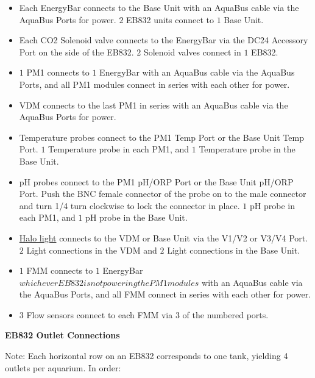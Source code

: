 \documentclass[]{book}
\providecommand{\tightlist}{%
  \setlength{\itemsep}{0pt}\setlength{\parskip}{0pt}}
\begin{document}
\begin{itemize}
\tightlist
\item
  Each EnergyBar connects to the Base Unit with an AquaBus cable via the
  AquaBus Ports for power. \(2\) EB832 units connect to \(1\) Base
  Unit.\\
\item
  Each CO2 Solenoid valve connects to the EnergyBar via the DC24
  Accessory Port on the side of the EB832. \(2\) Solenoid valves connect
  in \(1\) EB832.\\
\item
  \(1\) PM1 connects to \(1\) EnergyBar with an AquaBus cable via the
  AquaBus Ports, and all PM1 modules connect in series with each other
  for power.\\
\item
  VDM connects to the last PM1 in series with an AquaBus cable via the
  AquaBus Ports for power.\\
\item
  Temperature probes connect to the PM1 Temp Port or the Base Unit Temp
  Port. \(1\) Temperature probe in each PM1, and \(1\) Temperature probe
  in the Base Unit.\\
\item
  pH probes connect to the PM1 pH/ORP Port or the Base Unit pH/ORP Port.
  Push the BNC female connector of the probe on to the male connector
  and turn 1/4 turn clockwise to lock the connector in place. \(1\) pH
  probe in each PM1, and \(1\) pH probe in the Base Unit.\\
\item
  \href{https://github.com/SilbigerLab/Mesocosm_User_Manual/tree/394a3f7d9fed8765e4152f9fdd11d00a2ea87a93/Manuals/HALO_Quick_Start_Guide.pdf}{Halo
  light} connects to the VDM or Base Unit via the V1/V2 or V3/V4 Port.
  \(2\) Light connections in the VDM and \(2\) Light connections in the
  Base Unit.\\
\item
  \(1\) FMM connects to \(1\) EnergyBar
  \(whichever EB832 is not powering the PM1 modules\) with an AquaBus
  cable via the AquaBus Ports, and all FMM connect in series with each
  other for power.\\
\item
  \(3\) Flow sensors connect to each FMM via \(3\) of the numbered
  ports.
\end{itemize}

\textbf{EB832 Outlet Connections}

Note: Each horizontal row on an EB832 corresponds to one tank, yielding
4 outlets per aquarium. In order:
\end{document}
